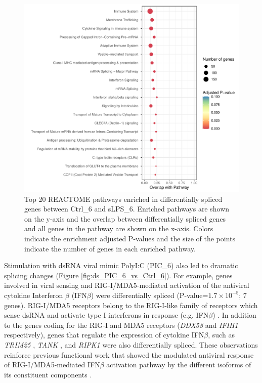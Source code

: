 \begin{figure}[H]
  \centering
  \includegraphics[width=\textwidth]{ds_sLPS_6_vs_Ctrl_6}
  \caption[REACTOME pathways enriched in differentially spliced genes (sLPS\_6 versus Ctrl\_6)]{Top 20 REACTOME pathways enriched in differentially spliced genes between Ctrl\_6 and sLPS\_6. Enriched pathways are shown on the y-axis and the overlap between differentially spliced genes and all genes in the pathway are shown on the x-axis. Colors indicate the enrichment adjusted P-values and the size of the points indicate the number of genes in each enriched pathway.}
  \label{fig:ds_sLPS_6_vs_Ctrl_6}   
\end{figure}

Stimulation with dsRNA viral mimic PolyI:C (PIC\_6) also led to dramatic splicing changes (Figure \ref{fig:ds_PIC_6_vs_Ctrl_6}). For example, genes involved in viral sensing and RIG-I/MDA5-mediated activation of the antiviral cytokine Interferon $\beta$ (IFN$\beta$) were differentially spliced (P-value=$1.7\times10^{-5}$; 7 genes). RIG-I/MDA5 receptors belong to the RIG-I-like family of receptors which sense dsRNA and activate type I interferons in response (e.g. IFN$\beta$) \cite{Yoneyama2005-ba,Kato2005-ie}. In addition to the genes coding for the RIG-I and MDA5 receptors (\textit{DDX58} and \textit{IFIH1} respectively), genes that regulate the expression of cytokine IFN$\beta$, such as \textit{TRIM25} \cite{Castanier2012-io}, \textit{TANK} \cite{Al_Hamrashdi2022-pr}, and \textit{RIPK1} \cite{Saleh2017-fv} were also differentially spliced. These observations reinforce previous functional work that showed the modulated antiviral response of RIG-I/MDA5-mediated IFN$\beta$ activation pathway by the different isoforms of its constituent components \cite{Gack2009-nw,Liao2021-aj,Lad2008-jd}. \\



